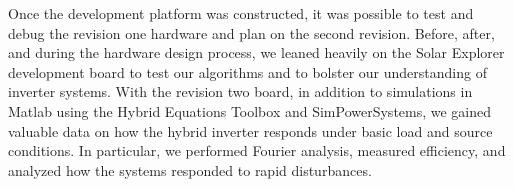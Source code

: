 Once the development platform was constructed, it was possible to test and debug the revision one hardware and plan on the second revision. Before, after, and during the hardware design process, we leaned heavily on the Solar Explorer development board to test our algorithms and to bolster our understanding of inverter systems. With the revision two board, in addition to simulations in Matlab using the Hybrid Equations Toolbox and SimPowerSystems, we gained valuable data on how the hybrid inverter responds under basic load and source conditions. In particular, we performed Fourier analysis, measured efficiency, and analyzed how the systems responded to rapid disturbances.




